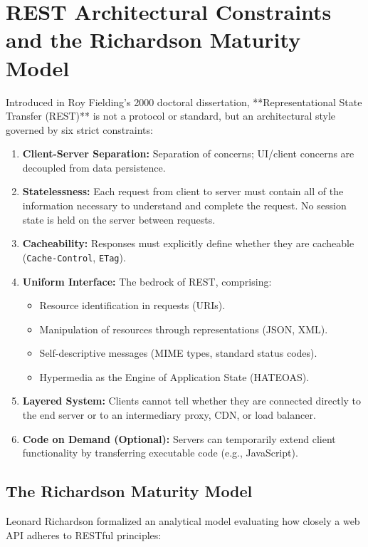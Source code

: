 \section{REST Architectural Constraints and the Richardson Maturity Model}

Introduced in Roy Fielding's 2000 doctoral dissertation, **Representational State Transfer (REST)** is not a protocol or standard, but an architectural style governed by six strict constraints:

\begin{enumerate}[leftmargin=15pt]
  \item \textbf{Client-Server Separation:} Separation of concerns; UI/client concerns are decoupled from data persistence.
  \item \textbf{Statelessness:} Each request from client to server must contain all of the information necessary to understand and complete the request. No session state is held on the server between requests.
  \item \textbf{Cacheability:} Responses must explicitly define whether they are cacheable (\texttt{Cache-Control}, \texttt{ETag}).
  \item \textbf{Uniform Interface:} The bedrock of REST, comprising:
  \begin{itemize}
    \item Resource identification in requests (URIs).
    \item Manipulation of resources through representations (JSON, XML).
    \item Self-descriptive messages (MIME types, standard status codes).
    \item Hypermedia as the Engine of Application State (HATEOAS).
  \end{itemize}
  \item \textbf{Layered System:} Clients cannot tell whether they are connected directly to the end server or to an intermediary proxy, CDN, or load balancer.
  \item \textbf{Code on Demand (Optional):} Servers can temporarily extend client functionality by transferring executable code (e.g., JavaScript).
\end{enumerate}

\subsection{The Richardson Maturity Model}

Leonard Richardson formalized an analytical model evaluating how closely a web API adheres to RESTful principles:

